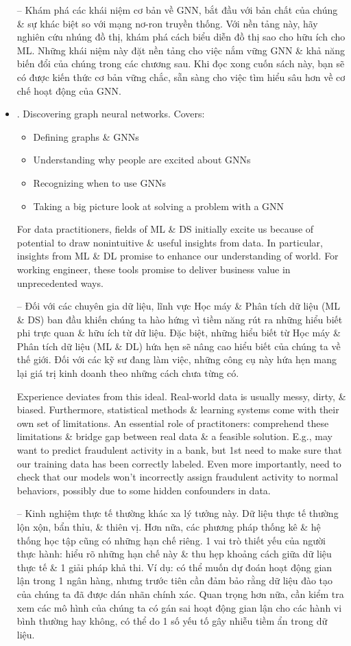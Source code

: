\documentclass{article}
\begin{document}
\begin{itemize}
    -- Khám phá các khái niệm cơ bản về GNN, bắt đầu với bản chất của chúng \& sự khác biệt so với mạng nơ-ron truyền thống. Với nền tảng này, hãy nghiên cứu nhúng đồ thị, khám phá cách biểu diễn đồ thị sao cho hữu ích cho ML. Những khái niệm này đặt nền tảng cho việc nắm vững GNN \& khả năng biến đổi của chúng trong các chương sau. Khi đọc xong cuốn sách này, bạn sẽ có được kiến thức cơ bản vững chắc, sẵn sàng cho việc tìm hiểu sâu hơn về cơ chế hoạt động của GNN.
    \item {. Discovering graph neural networks.} Covers:
    \begin{itemize}
        \item Defining graphs \& GNNs
        \item Understanding why people are excited about GNNs
        \item Recognizing when to use GNNs
        \item Taking a big picture look at solving a problem with a GNN
    \end{itemize}
    For data practitioners, fields of ML \& DS initially excite us because of potential to draw nonintuitive \& useful insights from data. In particular, insights from ML \& DL promise to enhance our understanding of world. For working engineer, these tools promise to deliver business value in unprecedented ways.

    -- Đối với các chuyên gia dữ liệu, lĩnh vực Học máy \& Phân tích dữ liệu (ML \& DS) ban đầu khiến chúng ta hào hứng vì tiềm năng rút ra những hiểu biết phi trực quan \& hữu ích từ dữ liệu. Đặc biệt, những hiểu biết từ Học máy \& Phân tích dữ liệu (ML \& DL) hứa hẹn sẽ nâng cao hiểu biết của chúng ta về thế giới. Đối với các kỹ sư đang làm việc, những công cụ này hứa hẹn mang lại giá trị kinh doanh theo những cách chưa từng có.

    Experience deviates from this ideal. Real-world data is usually messy, dirty, \& biased. Furthermore, statistical methods \& learning systems come with their own set of limitations. An essential role of practitoners: comprehend these limitations \& bridge gap between real data \& a feasible solution. E.g., may want to predict fraudulent activity in a bank, but 1st need to make sure that our training data has been correctly labeled. Even more importantly, need to check that our models won't incorrectly assign fraudulent activity to normal behaviors, possibly due to some hidden confounders in data.

    -- Kinh nghiệm thực tế thường khác xa lý tưởng này. Dữ liệu thực tế thường lộn xộn, bẩn thỉu, \& thiên vị. Hơn nữa, các phương pháp thống kê \& hệ thống học tập cũng có những hạn chế riêng. 1 vai trò thiết yếu của người thực hành: hiểu rõ những hạn chế này \& thu hẹp khoảng cách giữa dữ liệu thực tế \& 1 giải pháp khả thi. Ví dụ: có thể muốn dự đoán hoạt động gian lận trong 1 ngân hàng, nhưng trước tiên cần đảm bảo rằng dữ liệu đào tạo của chúng ta đã được dán nhãn chính xác. Quan trọng hơn nữa, cần kiểm tra xem các mô hình của chúng ta có gán sai hoạt động gian lận cho các hành vi bình thường hay không, có thể do 1 số yếu tố gây nhiễu tiềm ẩn trong dữ liệu.


\end{itemize}
\end{document}
